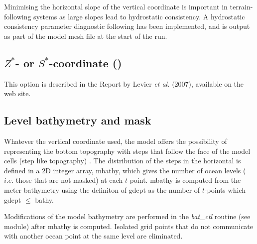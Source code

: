 \documentclass[../tex_main/NEMO_manual]{subfiles}
\begin{document}
Minimising the horizontal slope of the vertical coordinate is important in terrain-following systems as large slopes lead to hydrostatic consistency. A hydrostatic consistency parameter diagnostic following \citet{Haney1991} has been implemented, and is output as part of the model mesh file at the start of the run.

\subsection{$Z^*$- or $S^*$-coordinate (\protect{}) }
\label{subsec:DOM_zgr_star}

This option is described in the Report by Levier \textit{et al.} (2007), available on the \NEMO web site. 


\subsection{Level bathymetry and mask}
\label{subsec:DOM_msk}

Whatever the vertical coordinate used, the model offers the possibility of 
representing the bottom topography with steps that follow the face of the 
model cells (step like topography) \citep{Madec_al_JPO96}. The distribution of 
the steps in the horizontal is defined in a 2D integer array, mbathy, which 
gives the number of ocean levels ($i.e.$ those that are not masked) at each 
$t$-point. mbathy is computed from the meter bathymetry using the definiton of 
gdept as the number of $t$-points which gdept $\leq$ bathy.

Modifications of the model bathymetry are performed in the \textit{bat\_ctl} 
routine (see  module) after mbathy is computed. Isolated grid points 
that do not communicate with another ocean point at the same level are eliminated.
\end{document}
